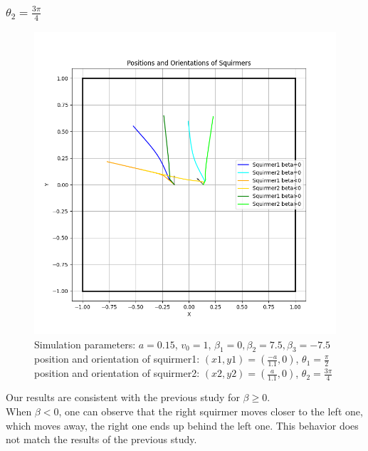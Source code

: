 \documentclass{article}
\begin{document}
\subsubsection{$\theta_2 = \frac{3\pi}{4}$}
\begin{figure}[h]
   \centering
   \includegraphics[width=1\textwidth]{graphs/simulations/twosquirmerinter/sq2.3pi.4.png}
   \caption{\footnotesize Simulation parameters: $a=0.15$, $v_0=1$, $\beta_1=0, \beta_2=7.5, \beta_3=-7.5$\\
   position and orientation of squirmer1: $(x1,y1)=(\frac{-a}{1.1},0)$, $\theta_1=\frac{\pi}{2}$\\
   position and orientation of squirmer2: $(x2,y2)=(\frac{a}{1.1},0)$, $\theta_2=\frac{3\pi}{4}$}
\end{figure}
Our results are consistent with the previous study for $\beta \ge 0$.\\
When $\beta < 0$, one can observe that the right squirmer moves closer to the left one, which moves away,
the right one ends up behind the left one. This behavior does not match the results of the previous study.\\

\newpage
\end{document}
